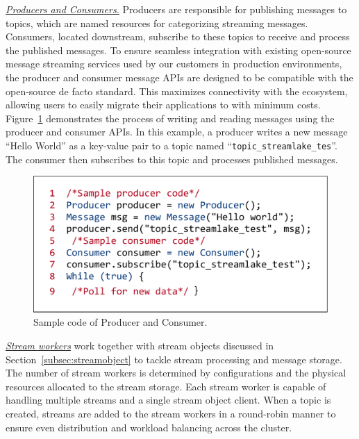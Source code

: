 \noindent\underline{\textit{Producers and Consumers.}} Producers are responsible for publishing messages to topics, which are named resources for categorizing streaming messages. Consumers, located downstream, subscribe to these topics to receive and process the published messages. To ensure seamless integration with existing open-source message streaming services used by our customers in production environments, the producer and consumer message APIs are designed to be compatible with the open-source de facto standard. This maximizes connectivity with the ecosystem, allowing users to easily migrate their applications to \sys with minimum costs. Figure~\ref{fig:producer}  demonstrates the process of writing and reading messages using the producer and consumer APIs. In this example, a producer writes a new message ``Hello World'' as a key-value pair to a topic named ``\texttt{topic\_streamlake\_tes}''. The consumer then subscribes to this topic and processes published messages.

\begin{figure}[htbp]
	\includegraphics[scale=0.3]{figures/producer}
	\centering
	\vspace{-1em}
	\caption{Sample code of Producer and Consumer.}
	\label{fig:producer}
	\vspace{-1em}
\end{figure}

\noindent\underline{\textit{Stream workers}} work together with stream objects discussed in Section~\ref{subsec:streamobject} to tackle stream processing and message storage. The number of stream workers is determined by configurations and the physical resources allocated to the stream storage. Each stream worker is capable of handling multiple streams and a single stream object client. When a topic is created, streams are added to the stream workers in a round-robin manner to ensure even distribution and workload balancing across the cluster.

